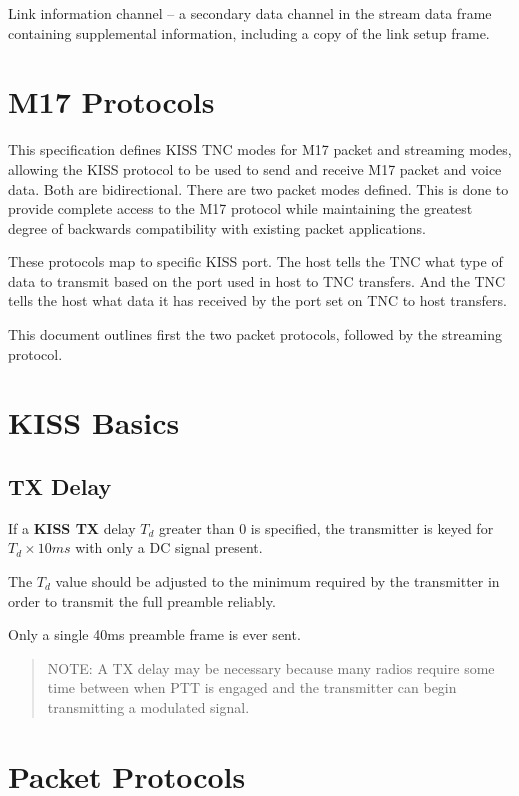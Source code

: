 \documentclass[a4paper,11pt,oneside]{article}
\begin{document}
Link information channel -- a secondary data channel in the stream data frame containing supplemental information, including a copy of the link setup frame.

\section{M17 Protocols}

This specification defines KISS TNC modes for M17 packet and streaming modes, allowing the KISS protocol to be used to send and receive M17 packet and voice data. Both are bidirectional. There are two packet modes defined. This is done to provide complete access to the M17 protocol while maintaining the greatest degree of backwards compatibility with existing packet applications.

These protocols map to specific KISS port. The host tells the TNC what type of data to transmit based on the port used in host to TNC transfers. And the TNC tells the host what data it has received by the port set on TNC to host transfers.

This document outlines first the two packet protocols, followed by the streaming protocol.

\section{KISS Basics}

\subsection{TX Delay}

If a \textbf{KISS TX} delay $T_d$ greater than 0 is specified, the transmitter is keyed for $T_d \times 10ms$ with only a DC signal present.

The $T_d$ value should be adjusted to the minimum required by the
transmitter in order to transmit the full preamble reliably.

Only a single 40ms preamble frame is ever sent.

\begin{quote}
	NOTE: A TX delay may be necessary because many radios require some 	time between when PTT is engaged and the transmitter can begin 	transmitting a modulated signal.
\end{quote}

\section{Packet Protocols}
\end{document}
